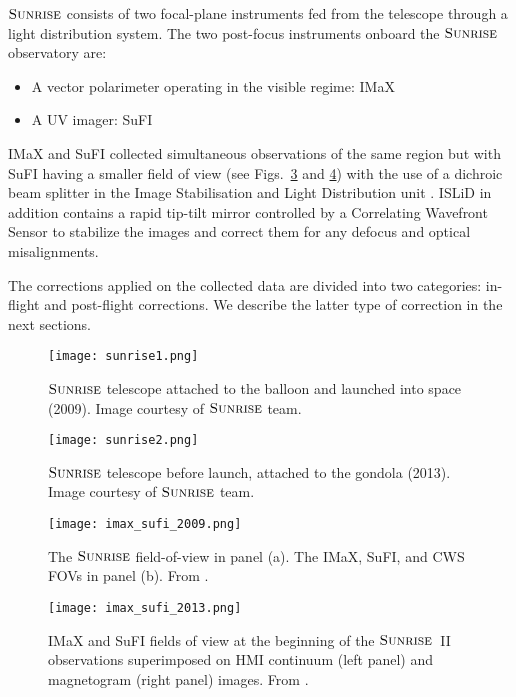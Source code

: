 \documentclass[goettingen, gauss, print]{thesis}
\begin{document}
$\sunrise$ consists of two focal-plane instruments fed from the telescope through a light distribution system. 
The two post-focus instruments onboard the $\sunrise$ observatory are: 
\begin{itemize}
\item A vector polarimeter operating in the visible regime: IMaX \citep[Imaging Magnetograph eXperiment;][]{martinezpillet_imaging_2011}
\item A UV imager: SuFI \cite[$\sunrise$ Filter Imager;][]{gandorfer_filter_2011}
\end{itemize}

IMaX and SuFI collected simultaneous observations of the same region but with SuFI having a smaller field of view (see Figs.~\ref{imax_sufi_2009} and \ref{imax_sufi_2013}) with the use of a dichroic beam splitter in the Image Stabilisation and Light Distribution unit \cite[ISLiD;][]{gandorfer_filter_2011}. ISLiD in addition contains a rapid tip-tilt mirror controlled by a Correlating Wavefront Sensor \cite[CWS;][]{berkefeld_wave-front_2011} to stabilize the images and correct them for any defocus and optical misalignments.

The corrections applied on the collected data are divided into two categories: in-flight and post-flight corrections. We describe the latter type of correction in the next sections.

\begin{figure}
\centering
\texttt{[image: sunrise1.png]}
\caption{$\sunrise$ telescope attached to the balloon and launched into space (2009). Image courtesy of $\sunrise$ team.}
\label{sunrise1}
\end{figure}

\begin{figure}
\centering
\texttt{[image: sunrise2.png]}
\caption{$\sunrise$ telescope before launch, attached to the gondola (2013). Image courtesy of $\sunrise$ team.}
\label{sunrise2}
\end{figure}


\begin{figure}[h!]
\centering
\texttt{[image: imax\_sufi\_2009.png]}
\caption{The $\sunrise$ field-of-view in panel (a). The IMaX, SuFI, and CWS FOVs in panel (b). From \cite{barthol_sunrise_2011}.}
\label{imax_sufi_2009}
\end{figure}

\begin{figure}[h!]
\centering
\texttt{[image: imax\_sufi\_2013.png]}
\caption{IMaX and SuFI fields of view at the beginning of the $\sunrise$~II observations superimposed on HMI continuum (left panel) and magnetogram (right panel) images. From \cite{solanki_second_2017}.}
\label{imax_sufi_2013}
\end{figure}
\newpage
\end{document}
